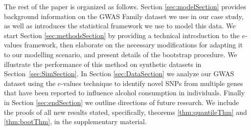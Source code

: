 The rest of the paper is organized as follows. Section \ref{sec:modelSection} provides background information on the GWAS Family dataset we use in our case study, as well as introduces the statistical framework we use to model this data. We start Section \ref{sec:methodsSection} by providing a technical introduction to the $e$-values framework, then elaborate on the necessary modifications for adapting it to our modelling scenario, and present details of the bootstrap procedure. We illustrate the performance of this method on synthetic datasets in Section~\ref{sec:SimSection}. In Section \ref{sec:DataSection} we analyze our GWAS dataset using the $e$-values technique to identify novel SNPs from multiple genes that have been reported to influence alcohol consumption in individuals. Finally in Section \ref{sec:endSection} we outline directions of future research. We include the proofs of all new results stated, specifically, theorems \ref{thm:quantileThm} and \ref{thm:bootThm}, in the supplementary material.